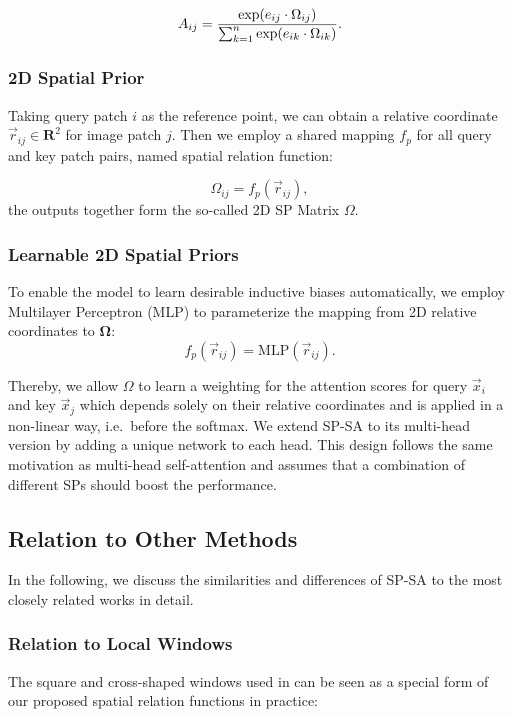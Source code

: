 \documentclass[authorversion, sigconf, acmthm=false, nonacm=true]{acmart}
\begin{document}
\begin{equation}
A_{ij} = \frac{{\rm exp} (e_{ij} \cdot \Omega_{ij})} {\sum^n_{k=1} {\rm exp} (e_{ik} \cdot \Omega_{ik})}.
\label{sp-sa}
\end{equation}

\subsubsection{2D Spatial Prior}
Taking query patch $i$ as the reference point, we can obtain a relative coordinate $\vec{r}_{ij} \in \mathbf{R}^{2}$ for image patch $j$. 
Then we employ a shared mapping $f_p$ for all query and key patch pairs, named spatial relation function:

\begin{equation}
    \Omega_{ij} = f_p(\vec{r}_{ij}),
\end{equation}
the outputs together form the so-called 2D SP Matrix $\Omega$.


\subsubsection{Learnable 2D Spatial Priors}
To enable the model to learn desirable inductive biases automatically, we 
employ Multilayer Perceptron (MLP) to parameterize the mapping from 2D relative coordinates to $\mathbf{\Omega}$:
\begin{equation}
    f_p(\vec{r}_{ij}) = \mathrm{MLP}(\vec{r}_{ij}).
\end{equation}

Thereby, we allow $\Omega$ to learn a weighting for the attention scores for query $\vec{x}_i$ and key $\vec{x}_j$ which depends solely on their relative coordinates and is applied in a non-linear way, i.e.~before the softmax.  
We extend SP-SA to its multi-head version by adding a unique network to each head. 
This design follows the same motivation as 
multi-head self-attention and assumes
that a combination of different SPs should boost the performance. 

\subsection{Relation to Other Methods}
In the following, we discuss the similarities and differences of SP-SA to the most closely related works in detail.
\subsubsection{Relation to Local Windows}
The square and cross-shaped windows used in \cite{liu2021swin, dong2021cswin} can be seen as a special form of our proposed spatial relation functions in practice:
\end{document}
